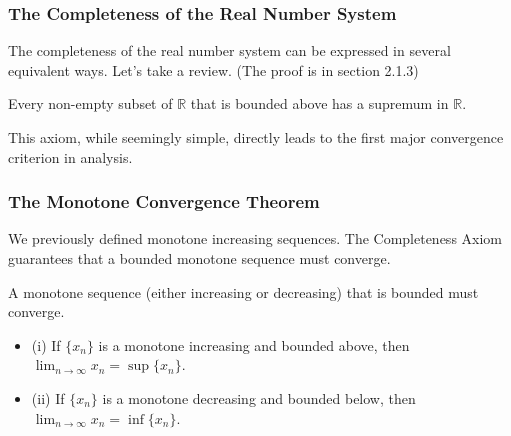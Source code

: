 \subsubsection{The Completeness of the Real Number System}

The completeness of the real number system can be expressed in several equivalent ways. Let's take a review. (The proof is in section 2.1.3)

\begin{theorem}
\label{thm:completeness_en}
Every non-empty subset of $\mathbb{R}$ that is bounded above has a supremum in $\mathbb{R}$.
\end{theorem}

This axiom, while seemingly simple, directly leads to the first major convergence criterion in analysis.

\subsubsection{The Monotone Convergence Theorem}

We previously defined monotone increasing sequences. The Completeness Axiom guarantees that a bounded monotone sequence must converge.

\begin{theorem}
\label{thm:mct_en}
A monotone sequence (either increasing or decreasing) that is bounded must converge.
\begin{itemize}
    \item (i) If $\{x_n\}$ is a monotone increasing and bounded above, then $\lim_{n \to \infty} x_n = \sup \{x_n\}$.
    \item (ii) If $\{x_n\}$ is a monotone decreasing and bounded below, then $\lim_{n \to \infty} x_n = \inf \{x_n\}$.
\end{itemize}
\end{theorem}

